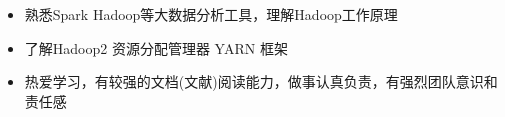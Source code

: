   \begin{itemize}[leftmargin=*]
    \item {熟悉Spark Hadoop等大数据分析工具，理解Hadoop工作原理}
    \item {了解Hadoop2 资源分配管理器 YARN 框架}
    \item {热爱学习，有较强的文档(文献)阅读能力，做事认真负责，有强烈团队意识和责任感}

  \end{itemize}